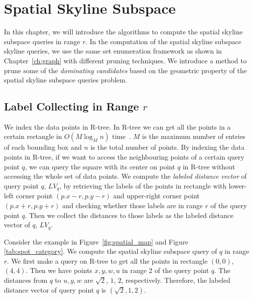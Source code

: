 
%
%

\chapter{Spatial Skyline Subspace}
\label{ch:spatial}

In this chapter, we will introduce the algorithms to compute the spatial skyline subspace queries in range $r$. In the computation of the spatial skyline subspace skyline queries, we use the same set enumeration framework as shown in Chapter~\ref{ch:graph} with different pruning techniques. We introduce a method to prune some of the \emph{dominating candidates} based on the geometric property of the spatial skyline subspace queries problem.

\section{Label Collecting in Range $r$}
We index the data points in R-tree. In R-tree we can get all the points in a certain rectangle in $O(M \log_M n)$ time~\cite{guttman1984r}. $M$ is the maximum number of entries of each bounding box and $n$ is the total number of points. By indexing the data points in R-tree, if we want to access the neighbouring points of a certain query point $q$, we can query the square with its center on point $q$ in R-tree without accessing the whole set of data points. We compute the \emph{labeled distance vector} of query point $q$, $LV_q$, by retrieving the labels of the points in rectangle with lower-left corner point $(p.x - r, p.y - r)$ and upper-right corner point $(p.x + r, p.y + r)$ and checking whether those labels are in range $r$ of the query point $q$. Then we collect the distances to those labels as the labeled distance vector of $q$, $LV_q$.

Consider the example in Figure~\ref{fig:spatial_map} and Figure~ \ref{tab:spot_category}. We compute the spatial skyline subspace query of $q$ in range $r$. We first make a query on R-tree to get all the points in rectangle $(0, 0)$, $(4, 4)$. Then we have points $x, y, w, u$ in range $2$ of the query point $q$. The distances from $q$ to $u, y, w$ are $\sqrt{2}$, $1$, $2$, respectively. Therefore, the labeled distance vector of query point $q$ is $(\sqrt{2}, 1, 2)$.

